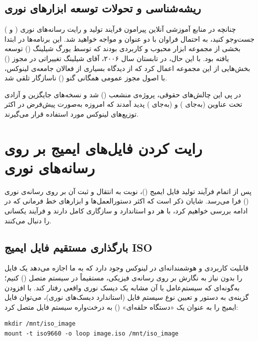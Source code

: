 \subsection{ریشه‌شناسی و تحولات توسعه ابزارهای نوری}

چنانچه در منابع آموزشی آنلاین پیرامون فرآیند تولید و رایت رسانه‌های نوری ( و ) جست‌وجو کنید، به احتمال فراوان با دو عنوان  و  مواجه خواهید شد. این برنامه‌ها در ابتدا بخشی از مجموعه ابزار محبوب و کاربردی  بودند که توسط یورگ شیلینگ () توسعه یافته بود. با این حال، در تابستان سال ۲۰۰۶، آقای شیلینگ تغییراتی در مجوز () بخش‌هایی از این مجموعه اعمال کرد که از دیدگاه بسیاری از فعالان جامعه‌ی لینوکس، با اصول مجوز عمومی همگانی گنو () ناسازگار تلقی شد.

در پی این چالش‌های حقوقی، پروژه‌ی  منشعب () شد و نسخه‌های جایگزین و آزادی تحت عناوین  (به‌جای ) و  (به‌جای ) پدید آمدند که امروزه به‌صورت پیش‌فرض در اکثر توزیع‌های لینوکس مورد استفاده قرار می‌گیرند.

\section{رایت کردن فایل‌های ایمیج بر روی رسانه‌های نوری}

پس از اتمام فرآیند تولید فایل ایمیج ()، نوبت به انتقال و ثبت آن بر روی رسانه‌ی نوری () فرا می‌رسد. شایان ذکر است که اکثر دستورالعمل‌ها و ابزارهای خط فرمانی که در ادامه بررسی خواهیم کرد، با هر دو استاندارد  و  سازگاری کامل دارند و فرآیند یکسانی را دنبال می‌کنند.

\subsection{بارگذاری مستقیم فایل ایمیج ISO}

قابلیت کاربردی و هوشمندانه‌ای در لینوکس وجود دارد که به ما اجازه می‌دهد یک فایل  را بدون نیاز به نگارش بر روی رسانه‌ی فیزیکی، مستقیماً در سیستم متصل () کنیم؛ به‌گونه‌ای که سیستم‌عامل با آن مشابه یک دیسک نوری واقعی رفتار کند. با افزودن گزینه‌ی  به دستور  و تعیین نوع سیستم فایل  (استاندارد دیسک‌های نوری)، می‌توان فایل ایمیج را به عنوان یک «دستگاه حلقه‌ای» () به درخت‌واره سیستم فایل متصل کرد:

\begin{latin}
\begin{lstlisting}
mkdir /mnt/iso_image
mount -t iso9660 -o loop image.iso /mnt/iso_image
\end{lstlisting}
\end{latin}

